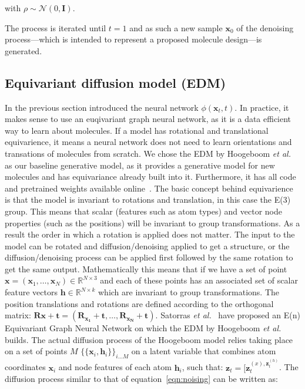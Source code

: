 \documentclass[journal=jacsat,manuscript=article]{achemso}
\begin{document}
with $\rho\sim\mathcal{N}(0,\mathbf{I})$.

The process is iterated until $t=1$ and as such a new sample $\mathbf{x}_0$ of the denoising process---which is intended to represent a proposed molecule design---is generated. 

\subsection*{Equivariant diffusion model (EDM)}
In the previous section introduced the neural network $\phi(\mathbf{x}_t,t)$. In practice, it makes sense to use an euqivariant graph neural network, as it is a data efficient way to learn about molecules. If a model has rotational and translational equivarience, it means a neural network does not need to learn orientations and transations of molecules from scratch. We chose the EDM by Hoogeboom \textit{et al.}~\cite{hoogeboom2022equivariant} as our baseline generative model, as it provides a generative model for new molecules and has equivariance already built into it. Furthermore, it has all code and pretrained weights available online~\cite{githubhoogeboom}. The basic concept behind equivarience is that the model is invariant to rotations and translation, in this case the E(3) group. This means that scalar (features such as atom types) and vector node properties (such as the positions) will be invariant to group transformations. As a result the order in which a rotation is applied does not matter. The input to the model can be rotated and diffusion/denoising  applied to get a structure, or the diffusion/denoising process can be applied first followed by the same rotation to get the same output. 
Mathematically this means that if we have a set of point $\mathbf{x} = (\mathbf{x}_1,\ldots,\mathbf{x}_N) \in \mathbb{R}^{N\times 3}$ and each of these points has an associated set of scalar feature vectors $\mathbf{h}\in \mathbb{R}^{N\times k}$ which are invariant to group transformations. The position translations and rotations are defined according to the orthogonal matrix: $\mathbf{Rx + t} = (\mathbf{R_{x_1}+t},\ldots, \mathbf{R_{x_N}+t})$. Satorras \textit{et al.}~\cite{satorras2022equivariant} have proposed an E(n) Equivariant Graph Neural Network on which the EDM by Hoogeboom \textit{et al.} builds. 
The actual diffusion process of the Hoogeboom model relies taking place on a set of points $M$ $\{\{\mathbf{x}_i,\mathbf{h}_i\}\}_{i\ldots M}$ on a latent variable that combines atom coordinates $\mathbf{x}_i$ and node features of each atom $\mathbf{h}_i$, such that: $\mathbf{z}_t = [\mathbf{z}_t^{(x), \mathbf{z}_t^{(h)}}$. The diffusion process similar to that of equation~\ref{eqn:noising} can be written as:
\end{document}
